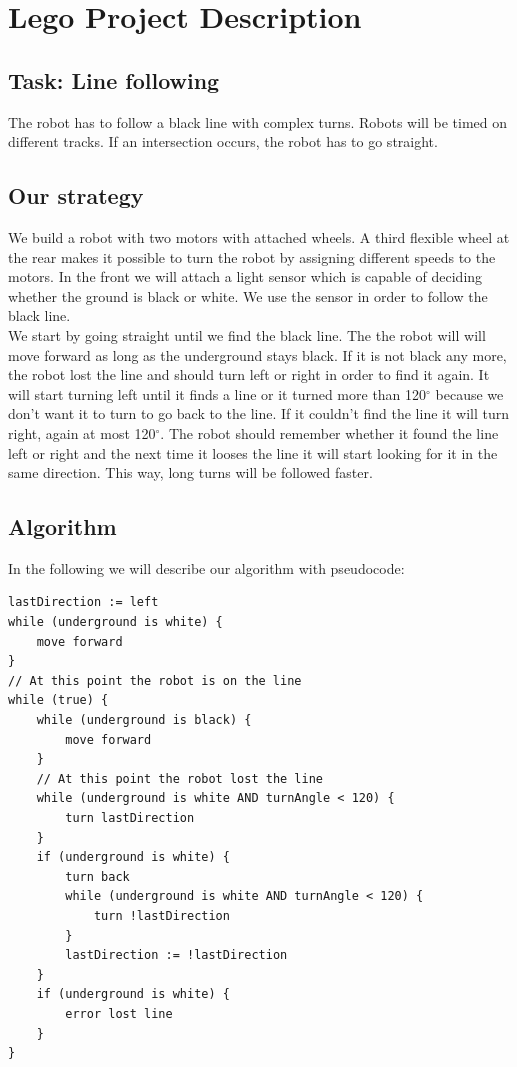 \documentclass[11pt,oneside,a4paper]{scrartcl}
\begin{document}
\section*{Lego Project Description}

\subsection*{Task: Line following}
The robot has to follow a black line with complex turns. Robots will be timed on 
different tracks. If an intersection occurs, the robot has to go straight.

\subsection*{Our strategy}
We build a robot with two motors with attached wheels. A third flexible wheel at the rear makes it possible to turn the robot by assigning different speeds to the motors. In the front we will attach a light sensor which is capable of deciding whether the ground is black or white. We use the sensor in order to follow the black line.\\
We start by going straight until we find the black line. The the robot will will move forward as long as the underground stays black. If it is not black any more, the robot lost the line and should turn left or right in order to find it again. It will start turning left until it finds a line or it turned more than 120$^{\circ}$ because we don't want it to turn to go back to the line. If it couldn't find the line it will turn right, again at most 120$^{\circ}$. The robot should remember whether it found the line left or right and the next time it looses the line it will start looking for it in the same direction. This way, long turns will be followed faster.

\subsection*{Algorithm}
In the following we will describe our algorithm with pseudocode:
\begin{lstlisting}
lastDirection := left
while (underground is white) {
	move forward
}
// At this point the robot is on the line
while (true) {
	while (underground is black) {
		move forward
	}
	// At this point the robot lost the line
	while (underground is white AND turnAngle < 120) {
		turn lastDirection
	}
	if (underground is white) {
		turn back
		while (underground is white AND turnAngle < 120) {
			turn !lastDirection
		}
		lastDirection := !lastDirection
	}
	if (underground is white) {
		error lost line
	}
}
\end{lstlisting}
\end{document}
